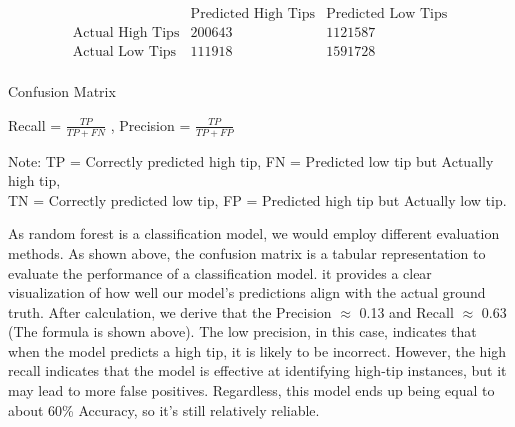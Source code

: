 \documentclass[11pt]{article}
\begin{document}
\begin{table}[ht]
\centering
\[
\begin{array}{c|cc}
& \text{Predicted High Tips} & \text{Predicted Low Tips} \\
\hline
\text{Actual High Tips} & 200643 & 1121587 \\
\text{Actual Low Tips} & 111918 & 1591728 \\
\end{array}
\]
\caption{Confusion Matrix}
\end{table}

\begin{center}
    
Recall = $\frac{TP}{TP + FN}$ , \quad Precision = $\frac{TP}{TP + FP}$

\small{Note: TP = Correctly predicted high tip, FN = Predicted low tip but Actually high tip, \\
TN = Correctly predicted low tip, FP = Predicted high tip but Actually low tip.}
\end{center}
As random forest is a classification model, we would employ different evaluation methods. As shown above, the confusion matrix is a tabular representation to evaluate the performance of a classification model. it provides a clear visualization of how well our model's predictions align with the actual ground truth. After calculation, we derive that the Precision $\approx$ 0.13 and Recall $\approx$ 0.63 (The formula is shown above). The low precision, in this case, indicates that when the model predicts a high tip, it is likely to be incorrect. However, the high recall indicates that the model is effective at identifying high-tip instances, but it may lead to more false positives. Regardless, this model ends up being equal to about 60\% Accuracy, so it's still relatively reliable.
\end{document}
